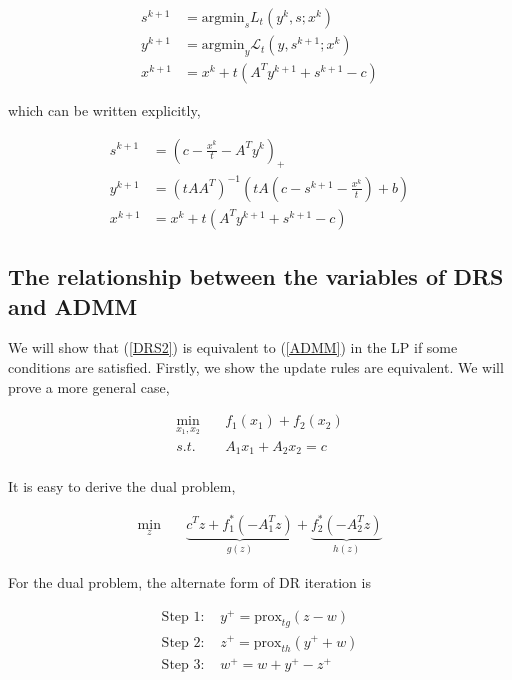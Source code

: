 \documentclass[a4paper]{article}
\begin{document}
\begin{equation}\label{ADMM}
\begin{split}
s^{k+1}&=\textrm{argmin}_s L_{t}(y^k,s;x^k) \\
y^{k+1}&=\textrm{argmin}_y\mathcal{L}_{t}(y,s^{k+1};x^k)\\
x^{k+1}&=x^k + t(A^Ty^{k+1}+s^{k+1}-c)
\end{split}
\end{equation}

which can be written explicitly, 

\begin{equation}
\begin{split}
s^{k+1}&=(c-\frac{x^k}{t}-A^Ty^k)_+ \\
y^{k+1}&=(t AA^T)^{-1}(t A(c-s^{k+1}-\frac{x^k}{t})+b) \\
x^{k+1}&=x^k + t(A^Ty^{k+1}+s^{k+1}-c)
\end{split}
\end{equation}

\subsection{The relationship between the variables of DRS and ADMM}
We will show that (\ref{DRS2}) is equivalent to (\ref{ADMM}) in the LP if some conditions are satisfied. Firstly, we show the update rules are equivalent. We will prove a more general case, 

\begin{equation}\label{generalP}
\begin{split}
\mathop{\min}_{x_1,x_2} \quad & f_1(x_1) + f_2(x_2)\\
s.t. \quad & A_1x_1 + A_2x_2 = c\\
\end{split}
\end{equation}

It is easy to derive the dual problem, 

\begin{equation}\label{generalD}
\begin{split}
\mathop{\min}_{z} \quad & 
\underbrace{c^T z + f_1^*(-A_1^Tz)}_{g(z)} + \underbrace{f_2^*(-A_2^Tz)}_{h(z)}
\end{split}
\end{equation}

For the dual problem, the alternate form of DR iteration is

\begin{equation}
\begin{split}
	\textrm{Step 1: } & y^+ = \mathrm{prox}_{tg}(z-w)\\
	\textrm{Step 2: } & z^+ = \mathrm{prox}_{th}(y^+ + w)\\
	\textrm{Step 3: } & w^+ = w+y^+-z^+
\end{split}
\end{equation}
\end{document}
